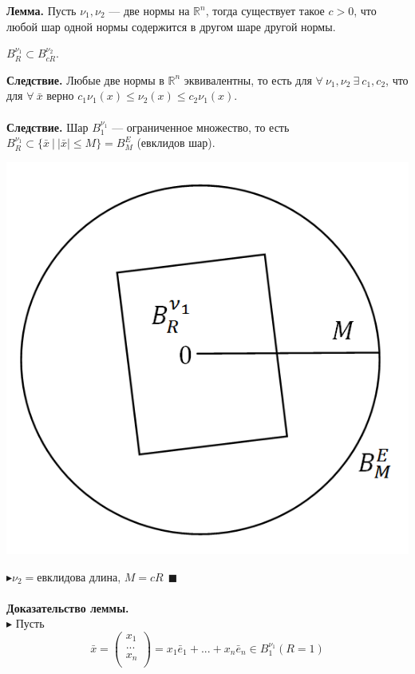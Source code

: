 \documentclass[12pt]{article}
\theoremstyle{definition}
\numberwithin{equation}{section}
\begin{document}
\textbf{Лемма.}
Пусть $\nu_1, \nu_2$ --- две нормы на $\mathbb{R}^n$, тогда существует такое $c>0$, что любой шар одной нормы содержится в другом шаре другой нормы.\begin{center}
$B_R^{\nu_1} \subset B_{cR}^{\nu_2}$.\end{center}
\textbf{Следствие.}
Любые две нормы в $\mathbb{R}^n$ эквивалентны, то есть для $\forall~ \nu_1, \nu_2 ~\exists~ c_1, c_2$, что для $\forall ~\bar x$ верно $c_1\nu_1(x) \leqslant \nu_2(x) \leqslant c_2\nu_1(x)$.\\
\\
\textbf{Следствие.}
Шар $B_1^{\nu_1}$ --- ограниченное множество, то есть $B_R^{\nu_1} \subset \{ \bar x ~|~ |\bar x| \leqslant M \} = B_M^E$ (евклидов шар).\begin{center}
\includegraphics[scale=0.5]{l5_4.png}\end{center}
$\blacktriangleright \nu_2 = $евклидова длина, $M=cR ~~ \blacksquare$\\
\\
\textbf{Доказательство леммы.}\\
$\blacktriangleright$ 
Пусть \[\bar x = \begin{pmatrix}
x_1 \\
...\\
x_n \\
\end{pmatrix} = x_1 \bar e_1 +...+x_n \bar e_n \in B_1^{\nu_1} (R = 1)\]
\end{document}
